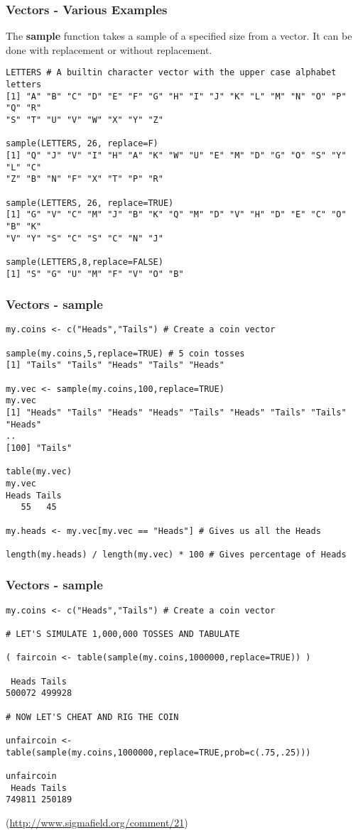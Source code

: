 \documentclass{beamer}
\begin{document}
%
\begin{frame}[fragile]
\frametitle{Vectors - Various Examples}
The \textbf{sample} function takes a sample of a specified size from a vector. It can be done with replacement or without replacement.

\scriptsize
\begin{verbatim}
LETTERS # A builtin character vector with the upper case alphabet letters
[1] "A" "B" "C" "D" "E" "F" "G" "H" "I" "J" "K" "L" "M" "N" "O" "P" "Q" "R"
"S" "T" "U" "V" "W" "X" "Y" "Z"

sample(LETTERS, 26, replace=F)
[1] "Q" "J" "V" "I" "H" "A" "K" "W" "U" "E" "M" "D" "G" "O" "S" "Y" "L" "C"
"Z" "B" "N" "F" "X" "T" "P" "R"

sample(LETTERS, 26, replace=TRUE)
[1] "G" "V" "C" "M" "J" "B" "K" "Q" "M" "D" "V" "H" "D" "E" "C" "O" "B" "K"
"V" "Y" "S" "C" "S" "C" "N" "J"

sample(LETTERS,8,replace=FALSE)
[1] "S" "G" "U" "M" "F" "V" "O" "B"
\end{verbatim}
\end{frame}

%
\begin{frame}[fragile]
\frametitle{Vectors - sample}

\scriptsize
\begin{verbatim}
my.coins <- c("Heads","Tails") # Create a coin vector

sample(my.coins,5,replace=TRUE) # 5 coin tosses
[1] "Tails" "Tails" "Heads" "Tails" "Heads"

my.vec <- sample(my.coins,100,replace=TRUE)
my.vec
[1] "Heads" "Tails" "Heads" "Heads" "Tails" "Heads" "Tails" "Tails" "Heads"
..
[100] "Tails"

table(my.vec)
my.vec
Heads Tails
   55   45
   
my.heads <- my.vec[my.vec == "Heads"] # Gives us all the Heads

length(my.heads) / length(my.vec) * 100 # Gives percentage of Heads
\end{verbatim}
\end{frame}

%
\begin{frame}[fragile]
\frametitle{Vectors - sample}

\footnotesize
\begin{verbatim}
my.coins <- c("Heads","Tails") # Create a coin vector

# LET'S SIMULATE 1,000,000 TOSSES AND TABULATE

( faircoin <- table(sample(my.coins,1000000,replace=TRUE)) )

 Heads Tails
500072 499928

# NOW LET'S CHEAT AND RIG THE COIN

unfaircoin <- table(sample(my.coins,1000000,replace=TRUE,prob=c(.75,.25)))

unfaircoin
 Heads Tails
749811 250189
\end{verbatim}
\begin{center}
\scriptsize(\url{http://www.sigmafield.org/comment/21})
\end{center}
\end{frame}
\end{document}
